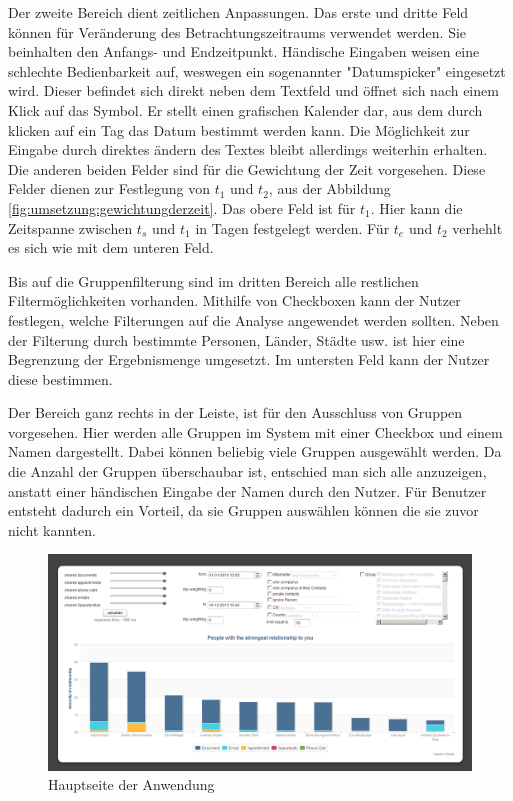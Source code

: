 Der zweite Bereich dient zeitlichen Anpassungen. Das erste und dritte Feld können für Veränderung des Betrachtungszeitraums verwendet werden. Sie beinhalten den Anfangs- und Endzeitpunkt. Händische Eingaben weisen eine schlechte Bedienbarkeit auf, weswegen ein sogenannter "Datumspicker" eingesetzt wird. Dieser befindet sich direkt neben dem Textfeld und öffnet sich nach einem Klick auf das Symbol. Er stellt einen grafischen Kalender dar, aus dem durch klicken auf ein Tag das Datum bestimmt werden kann. Die Möglichkeit zur Eingabe durch direktes ändern des Textes bleibt allerdings weiterhin erhalten. Die anderen beiden Felder sind für die Gewichtung der Zeit vorgesehen. Diese Felder dienen zur Festlegung von $t_1$ und $t_2$, aus der Abbildung \ref{fig:umsetzung:gewichtungderzeit}. Das obere Feld ist für $t_1$. Hier kann die Zeitspanne zwischen $t_{s}$ und $t_1$ in Tagen festgelegt werden. Für $t_{e}$ und $t_2$ verhehlt es sich wie mit dem unteren Feld.

Bis auf die Gruppenfilterung sind im dritten Bereich alle restlichen Filtermöglichkeiten vorhanden. Mithilfe von Checkboxen kann der Nutzer festlegen, welche Filterungen auf die Analyse angewendet werden sollten. Neben der Filterung durch bestimmte Personen, Länder, Städte usw. ist hier eine Begrenzung der Ergebnismenge umgesetzt. Im untersten Feld kann der Nutzer diese bestimmen.

Der Bereich ganz rechts in der Leiste, ist für den Ausschluss von Gruppen vorgesehen. Hier werden alle Gruppen im System mit einer Checkbox und einem Namen dargestellt. Dabei können beliebig viele Gruppen ausgewählt werden. Da die Anzahl der Gruppen überschaubar ist, entschied man sich alle anzuzeigen, anstatt einer händischen Eingabe der Namen durch den Nutzer. Für Benutzer entsteht dadurch ein Vorteil, da sie Gruppen auswählen können die sie zuvor nicht kannten.

\begin{figure}[htbp]
\centering
\includegraphics[width=\textwidth]{pics/final_screen.png}
\caption{Hauptseite der Anwendung}
\label{ergebniss_oberflaeche_haupt}
\end{figure}

